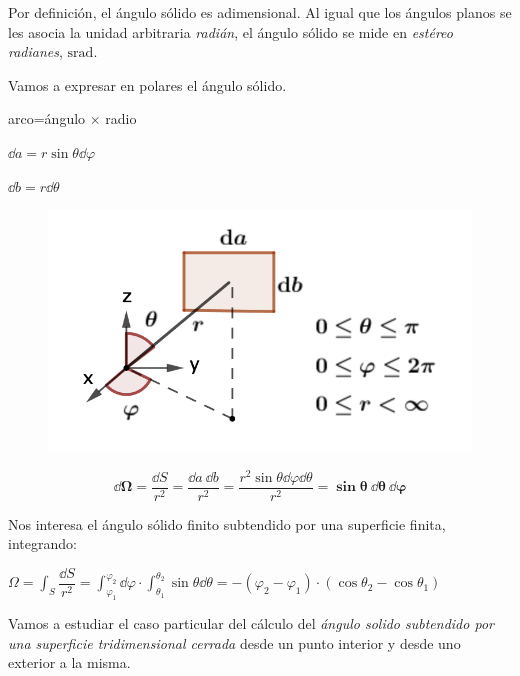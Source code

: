 Por definición, el ángulo sólido es adimensional. Al igual que los ángulos planos se les asocia la unidad arbitraria \emph{radián}, el ángulo sólido se mide en \emph{estéreo radianes}, $\mathrm{srad }$.


\begin{multicols}{2}
Vamos a expresar en polares el ángulo sólido.

arco=ángulo $\times$ radio

$\dd a = r \sin \theta \dd \varphi$

$\dd b= r \dd \theta$
\begin{figure}[H]
	\centering
	\includegraphics[width=.4\textwidth]{imagenes/imagenes23/T23IM04.png}
\end{figure}	
\end{multicols}

$$\boldsymbol{\dd \Omega=} \dfrac{\dd S}{r^2}=\dfrac{\dd a \ \dd b}{r^2}= \dfrac {r^2 \sin \theta \dd \varphi \dd \theta}{r^2} \boldsymbol{=\sin \theta \  \dd \theta \ \dd \varphi}$$

Nos interesa el ángulo sólido finito subtendido por una superficie finita, integrando:

$\Omega= \displaystyle \int_S \dfrac{\dd S}{r^2}=\int_{\varphi_1}^{\varphi_2} \dd \varphi \cdot \int_{\theta_1}^{\theta_2} \sin \theta \dd \theta = -(\varphi_2-\varphi_1)\cdot (\cos \theta_2-\cos \theta_1)$

Vamos a estudiar el caso particular del cálculo del \emph{ángulo solido subtendido por una superficie tridimensional cerrada} desde un punto interior y desde uno exterior a la misma.


